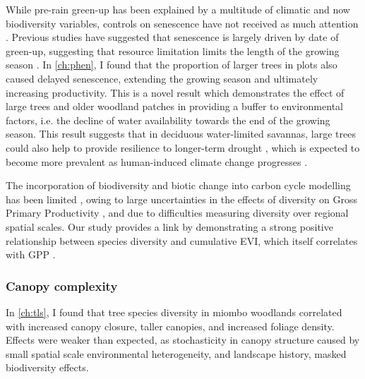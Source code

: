 \begin{refsection}

While pre-rain green-up has been explained by a multitude of climatic and now biodiversity variables, controls on senescence have not received as much attention \citep{}. Previous studies have suggested that senescence is largely driven by date of green-up, suggesting that resource limitation limits the length of the growing season \citep{Ryan}. In \autoref{ch:phen}, I found that the proportion of larger trees in plots also caused delayed senescence, extending the growing season and ultimately increasing productivity. This is a novel result which demonstrates the effect of large trees and older woodland patches in providing a buffer to environmental factors, i.e. the decline of water availability towards the end of the growing season. This result suggests that in deciduous water-limited savannas, large trees could also help to provide resilience to longer-term drought \citep{}, which is expected to become more prevalent as human-induced climate change progresses \citep{}.

The incorporation of biodiversity and biotic change into carbon cycle modelling has been limited \citep{Ahlstrom2015, Bodegom2011}, owing to large uncertainties in the effects of diversity on Gross Primary Productivity \citep{}, and due to difficulties measuring diversity over regional spatial scales. Our study provides a link by demonstrating a strong positive relationship between species diversity and cumulative EVI, which itself correlates with GPP \citep{Sjostrom2011}.


\subsubsection{Canopy complexity}

In \autoref{ch:tls}, I found that tree species diversity in miombo woodlands correlated with increased canopy closure, taller canopies, and increased foliage density. Effects were weaker than expected, as stochasticity in canopy structure caused by small spatial scale environmental heterogeneity, and landscape history, masked biodiversity effects.



\end{refsection}
